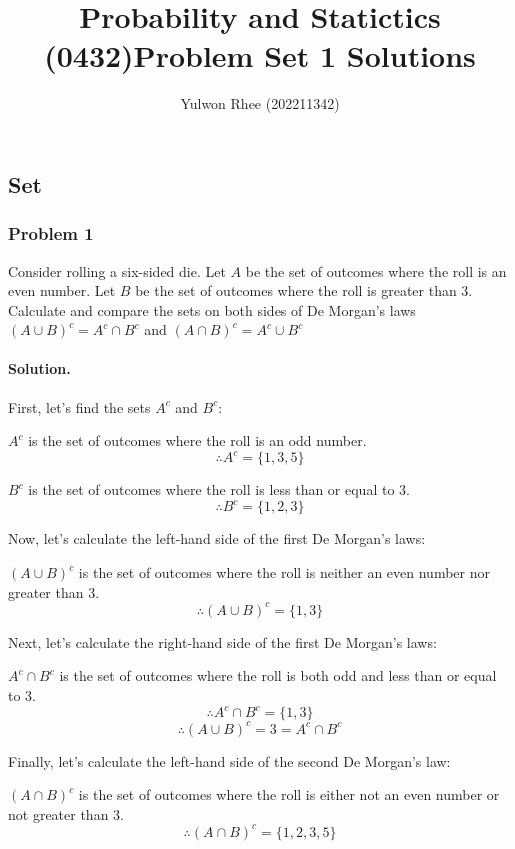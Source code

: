 



\title{Probability and Statictics (0432)\newline\space Problem Set 1 Solutions}
\author{Yulwon Rhee (202211342)}

\maketitle

\setcounter{section}{1}
\subsection{Set}
\subsubsection{Problem 1}
Consider rolling a six-sided die. Let $A$ be the set of outcomes where the roll is an even number.
Let $B$ be the set of outcomes where the roll is greater than 3.
Calculate and compare the sets on both sides of De Morgan's laws $(A\cup B)^c = A^c \cap B^c$ and $(A\cap B)^c = A^c \cup B^c$
\paragraph{Solution.}
First, let's find the sets $A^c$ and $B^c$:

$A^c$ is the set of outcomes where the roll is an odd number.
$$\therefore A^c = \{1, 3, 5\}$$

$B^c$ is the set of outcomes where the roll is less than or equal to 3.
$$\therefore B^c = \{1, 2, 3\}$$

Now, let's calculate the left-hand side of the first De Morgan's laws:

$(A\cup B)^c$ is the set of outcomes where the roll is neither an even number nor greater than 3.
$$\therefore (A\cup B)^c = \{1, 3\}$$

Next, let's calculate the right-hand side of the first De Morgan's laws:

$A^c \cap B^c$ is the set of outcomes where the roll is both odd and less than or equal to 3.
$$\therefore A^c \cap B^c = \{1, 3\}$$
$$\therefore (A\cup B)^c = {3} = A^c \cap B^c$$

Finally, let's calculate the left-hand side of the second De Morgan's law:

$(A\cap B)^c$ is the set of outcomes where the roll is either not an even number or not greater than 3.
$$\therefore (A\cap B)^c = \{1, 2, 3, 5\}$$

